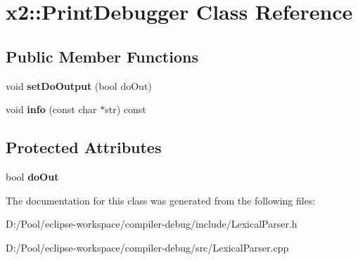 \hypertarget{classx2_1_1_print_debugger}{}\section{x2\+:\+:Print\+Debugger Class Reference}
\label{classx2_1_1_print_debugger}
\subsection*{Public Member Functions}
\begin{DoxyCompactItemize}
\item 
\mbox{\label{classx2_1_1_print_debugger_a5afc69d2cfd1b614709cd83acd939454}} 
void {\bfseries set\+Do\+Output} (bool do\+Out)
\item 
\mbox{\label{classx2_1_1_print_debugger_a2d028f4cb8539aa2aa11397d67d1957e}} 
void {\bfseries info} (const char $\ast$str) const
\end{DoxyCompactItemize}
\subsection*{Protected Attributes}
\begin{DoxyCompactItemize}
\item 
\mbox{\label{classx2_1_1_print_debugger_a680935be880997259b6848e774681aa1}} 
bool {\bfseries do\+Out}
\end{DoxyCompactItemize}


The documentation for this class was generated from the following files\+:\begin{DoxyCompactItemize}
\item 
D\+:/\+Pool/eclipse-\/workspace/compiler-\/debug/include/Lexical\+Parser.\+h\item 
D\+:/\+Pool/eclipse-\/workspace/compiler-\/debug/src/Lexical\+Parser.\+cpp\end{DoxyCompactItemize}
